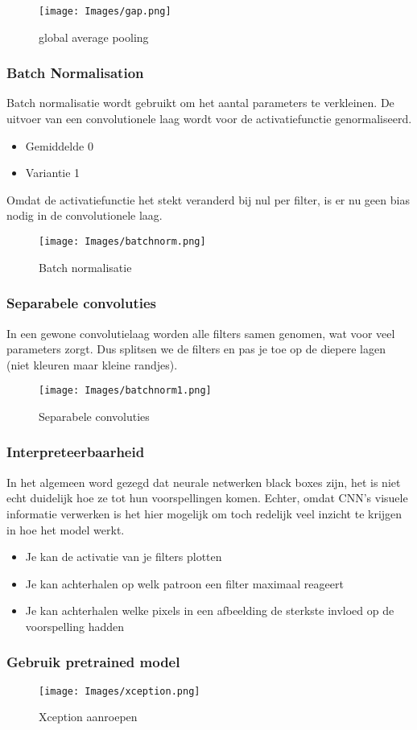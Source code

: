 {\begin{figure}[h!]
    \centering
    \texttt{[image: Images/gap.png]}
    \caption{global average pooling}
    \label{fig:filters}
\end{figure}

\subsubsection{Batch Normalisation}
Batch normalisatie wordt gebruikt om het aantal parameters te verkleinen. De uitvoer van een convolutionele laag wordt voor de activatiefunctie genormaliseerd.
\begin{itemize}
    \item Gemiddelde 0
    \item Variantie 1
\end{itemize}
Omdat de activatiefunctie het stekt veranderd bij nul per filter, is er nu geen bias nodig in de convolutionele laag.
\begin{figure}[h!]
    \centering
    \texttt{[image: Images/batchnorm.png]}
    \caption{Batch normalisatie}
    \label{fig:filters}
\end{figure}

\subsubsection{Separabele convoluties}
In een gewone convolutielaag worden alle filters samen genomen, wat voor veel parameters zorgt. Dus splitsen we de filters en pas je toe op de diepere lagen (niet kleuren maar kleine randjes).
\begin{figure}[h!]
    \centering
    \texttt{[image: Images/batchnorm1.png]}
    \caption{Separabele convoluties}
    \label{fig:filters}
\end{figure}

\subsubsection{Interpreteerbaarheid}
In het algemeen word gezegd dat neurale netwerken black boxes zijn, het is niet echt duidelijk hoe ze tot hun voorspellingen komen. Echter, omdat CNN's visuele informatie verwerken is het hier mogelijk om toch redelijk veel inzicht te krijgen in hoe het model werkt.
\begin{itemize}
    \item Je kan de activatie van je filters plotten
    \item Je kan achterhalen op welk patroon een filter maximaal reageert
    \item Je kan achterhalen welke pixels in een afbeelding de sterkste invloed op de voorspelling hadden
\end{itemize}

\subsubsection{Gebruik pretrained model}
\begin{figure}[h!]
    \centering
    \texttt{[image: Images/xception.png]}
    \caption{Xception aanroepen}
    \label{fig:filters}
\end{figure}


}
